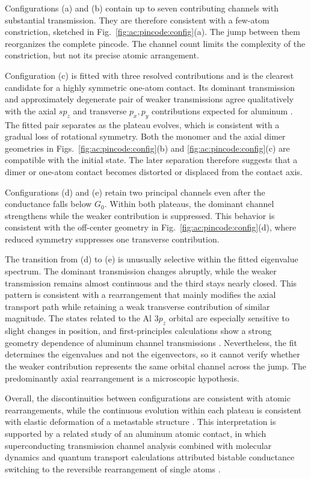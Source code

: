         Configurations (a) and (b) contain up to seven contributing channels with substantial transmission. They are therefore consistent with a few-atom constriction, sketched in Fig.~\ref{fig:ac:pincode:config}(a). The jump between them reorganizes the complete pincode. The channel count limits the complexity of the constriction, but not its precise atomic arrangement.

        Configuration (c) is fitted with three resolved contributions and is the clearest candidate for a highly symmetric one-atom contact. Its dominant transmission and approximately degenerate pair of weaker transmissions agree qualitatively with the axial $sp_z$ and transverse $p_x,p_y$ contributions expected for aluminum \cite{scheer_signature_1998}. The fitted pair separates as the plateau evolves, which is consistent with a gradual loss of rotational symmetry. Both the monomer and the axial dimer geometries in Figs.~\ref{fig:ac:pincode:config}(b) and \ref{fig:ac:pincode:config}(c) are compatible with the initial state. The later separation therefore suggests that a dimer or one-atom contact becomes distorted or displaced from the contact axis.

        Configurations (d) and (e) retain two principal channels even after the conductance falls below $G_0$. Within both plateaus, the dominant channel strengthens while the weaker contribution is suppressed. This behavior is consistent with the off-center geometry in Fig.~\ref{fig:ac:pincode:config}(d), where reduced symmetry suppresses one transverse contribution.

        The transition from (d) to (e) is unusually selective within the fitted eigenvalue spectrum. The dominant transmission changes abruptly, while the weaker transmission remains almost continuous and the third stays nearly closed. This pattern is consistent with a rearrangement that mainly modifies the axial transport path while retaining a weak transverse contribution of similar magnitude. The states related to the Al $3p_z$ orbital are especially sensitive to slight changes in position, and first-principles calculations show a strong geometry dependence of aluminum channel transmissions \cite{schwingenschlogl_geometry_2007,senkpiel_extracting_2022}. Nevertheless, the fit determines the eigenvalues and not the eigenvectors, so it cannot verify whether the weaker contribution represents the same orbital channel across the jump. The predominantly axial rearrangement is a microscopic hypothesis.

        Overall, the discontinuities between configurations are consistent with atomic rearrangements, while the continuous evolution within each plateau is consistent with elastic deformation of a metastable structure \cite{scheer_conduction_1997}. This interpretation is supported by a related study of an aluminum atomic contact, in which superconducting transmission channel analysis combined with molecular dynamics and quantum transport calculations attributed bistable conductance switching to the reversible rearrangement of single atoms \cite{schirm_current-driven_2013}.
        
